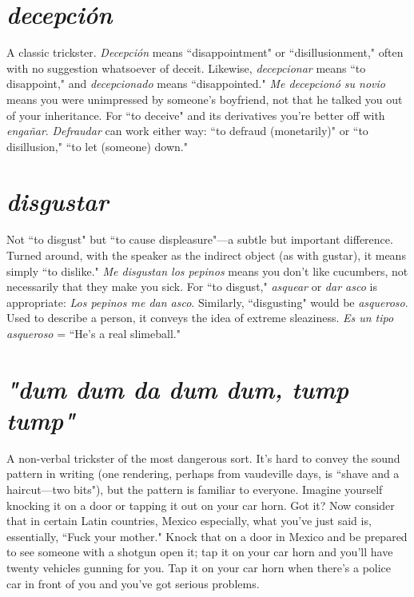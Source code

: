 \section{\emph{decepción}}

A classic trickster. \emph{Decepción} means ``disappointment" or ``disillusionment," often with no suggestion whatsoever
of deceit. Likewise, \emph{decepcionar} means ``to disappoint," and \emph{decepcionado} means ``disappointed." \emph{Me decepcionó su novio} means you
were unimpressed by someone's boyfriend, not that he talked you out
of your inheritance. For ``to deceive" and its derivatives you're better
off with \emph{engañar}. \emph{Defraudar} can work either way: ``to defraud (monetarily)" or ``to disillusion," ``to let (someone) down."

\section{\emph{disgustar}}

Not ``to disgust" but ``to cause displeasure"---a
subtle but important difference. Turned around, with the speaker as
the indirect object (as with gustar), it means simply ``to dislike." \emph{Me
disgustan los pepinos} means you don't like cucumbers, not necessarily
that they make you sick. For ``to disgust," \emph{asquear} or \emph{dar asco} is appropriate: \emph{Los pepinos me dan asco}. Similarly, ``disgusting" would be
\emph{asqueroso}. Used to describe a person, it conveys the idea of extreme
sleaziness. \emph{Es un tipo asqueroso} = ``He's a real slimeball."

\section{\emph{"dum dum da dum dum, tump tump"}}

A non-verbal trickster of the most dangerous sort. It's hard to convey the sound pattern
in writing (one rendering, perhaps from vaudeville days, is ``shave and
a haircut---two bits"), but the pattern is familiar to everyone. Imagine
yourself knocking it on a door or tapping it out on your car horn. Got
it? Now consider that in certain Latin countries, Mexico especially,
what you've just said is, essentially, ``Fuck your mother." Knock that
on a door in Mexico and be prepared to see someone with a shotgun
open it; tap it on your car horn and you'll have twenty vehicles gunning for you. Tap it on your car horn when there's a police car in front
of you and you've got serious problems.

